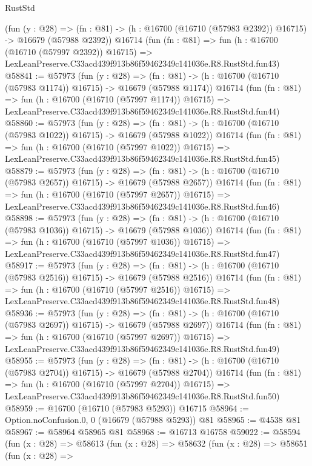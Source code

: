 \begin{lexlean}{RustStd}
\begin{coremodule}
    (fun (y : @28) =>
    (fn : @81) -> (h : @16700 (@16710 (@57983 @2392)) @16715) -> @16679 (@57988 @2392))
    @16714
    (fun (fn : @81) =>
    fun (h : @16700 (@16710 (@57997 @2392)) @16715) =>
    LexLeanPreserve.C33acd439f913b86f59462349c141036e.R8.RustStd.fun43)
@58841 := @57973
    (fun (y : @28) =>
    (fn : @81) -> (h : @16700 (@16710 (@57983 @1174)) @16715) -> @16679 (@57988 @1174))
    @16714
    (fun (fn : @81) =>
    fun (h : @16700 (@16710 (@57997 @1174)) @16715) =>
    LexLeanPreserve.C33acd439f913b86f59462349c141036e.R8.RustStd.fun44)
@58860 := @57973
    (fun (y : @28) =>
    (fn : @81) -> (h : @16700 (@16710 (@57983 @1022)) @16715) -> @16679 (@57988 @1022))
    @16714
    (fun (fn : @81) =>
    fun (h : @16700 (@16710 (@57997 @1022)) @16715) =>
    LexLeanPreserve.C33acd439f913b86f59462349c141036e.R8.RustStd.fun45)
@58879 := @57973
    (fun (y : @28) =>
    (fn : @81) -> (h : @16700 (@16710 (@57983 @2657)) @16715) -> @16679 (@57988 @2657))
    @16714
    (fun (fn : @81) =>
    fun (h : @16700 (@16710 (@57997 @2657)) @16715) =>
    LexLeanPreserve.C33acd439f913b86f59462349c141036e.R8.RustStd.fun46)
@58898 := @57973
    (fun (y : @28) =>
    (fn : @81) -> (h : @16700 (@16710 (@57983 @1036)) @16715) -> @16679 (@57988 @1036))
    @16714
    (fun (fn : @81) =>
    fun (h : @16700 (@16710 (@57997 @1036)) @16715) =>
    LexLeanPreserve.C33acd439f913b86f59462349c141036e.R8.RustStd.fun47)
@58917 := @57973
    (fun (y : @28) =>
    (fn : @81) -> (h : @16700 (@16710 (@57983 @2516)) @16715) -> @16679 (@57988 @2516))
    @16714
    (fun (fn : @81) =>
    fun (h : @16700 (@16710 (@57997 @2516)) @16715) =>
    LexLeanPreserve.C33acd439f913b86f59462349c141036e.R8.RustStd.fun48)
@58936 := @57973
    (fun (y : @28) =>
    (fn : @81) -> (h : @16700 (@16710 (@57983 @2697)) @16715) -> @16679 (@57988 @2697))
    @16714
    (fun (fn : @81) =>
    fun (h : @16700 (@16710 (@57997 @2697)) @16715) =>
    LexLeanPreserve.C33acd439f913b86f59462349c141036e.R8.RustStd.fun49)
@58955 := @57973
    (fun (y : @28) =>
    (fn : @81) -> (h : @16700 (@16710 (@57983 @2704)) @16715) -> @16679 (@57988 @2704))
    @16714
    (fun (fn : @81) =>
    fun (h : @16700 (@16710 (@57997 @2704)) @16715) =>
    LexLeanPreserve.C33acd439f913b86f59462349c141036e.R8.RustStd.fun50)
@58959 := @16700 (@16710 (@57983 @5293)) @16715
@58964 := Option.noConfusion.{0, 0} (@16679 (@57988 @5293)) @81
@58965 := @4538 @81
@58967 := @58964 @58965 @81
@58968 := @16713 @16758
@59022 := @58594
    (fun (x : @28) =>
    @58613
      (fun (x : @28) =>
      @58632
        (fun (x : @28) =>
        @58651
          (fun (x : @28) =>

\end{coremodule}
\end{lexlean}
